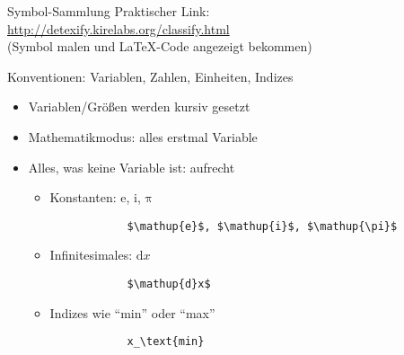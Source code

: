 \begin{frame}[fragile]{
  Symbol-Sammlung
  \hfill{}
  \hfill{}
}
  Praktischer Link: \\
  \url{http://detexify.kirelabs.org/classify.html} \\
  (Symbol malen und \LaTeX-Code angezeigt bekommen)
\end{frame}

\begin{frame}[fragile]{Konventionen: Variablen, Zahlen, Einheiten, Indizes}
  \begin{itemize}
    \item Variablen/Größen werden kursiv gesetzt
    \item Mathematikmodus: alles erstmal Variable
    \item Alles, was keine Variable ist: aufrecht
      \begin{itemize}
        \item Konstanten: $\mathup{e}$, $\mathup{i}$, $\mathup{\pi}$
          \smallskip
          \begin{lstlisting}
            $\mathup{e}$, $\mathup{i}$, $\mathup{\pi}$
          \end{lstlisting}
          \medskip
        \item Infinitesimales: $\mathup{d}x$
          \smallskip
          \begin{lstlisting}
            $\mathup{d}x$
          \end{lstlisting}
          \medskip
        \item Indizes wie \enquote{min} oder \enquote{max}
          \smallskip
          \begin{lstlisting}
            x_\text{min}
          \end{lstlisting}
      \end{itemize}
  \end{itemize}
\end{frame}

